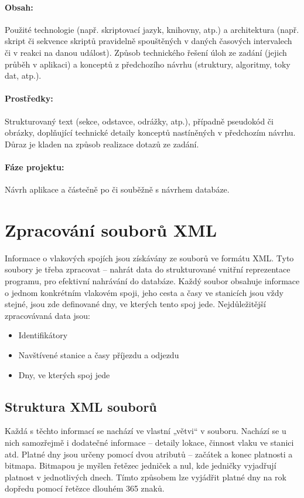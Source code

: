 \documentclass[10pt,xcolor=pdflatex,dvipsnames,table,oneside]{book}
\begin{document}
\paragraph{Obsah:}
Použité technologie (např. skriptovací jazyk, knihovny, atp.)
a architektura (např. skript či sekvence skriptů pravidelně spouštěných v daných časových intervalech či v reakci na danou událost).
Způsob technického řešení úloh ze zadání (jejich průběh v aplikaci) a konceptů z předchozího návrhu (struktury, algoritmy, toky dat, atp.).

\paragraph{Prostředky:}
Strukturovaný text (sekce, odstavce, odrážky, atp.), případně pseudokód či obrázky, doplňující technické detaily konceptů nastíněných v předchozím návrhu.
Důraz je kladen na způsob realizace dotazů ze zadání.

\paragraph{Fáze projektu:}
Návrh aplikace a částečně po či souběžně s návrhem databáze.
\fi
\section{Zpracování souborů XML}

Informace o vlakových spojích jsou získávány ze souborů ve formátu XML. Tyto soubory je třeba zpracovat – nahrát data do strukturované vnitřní reprezentace programu, pro efektivní nahrávání do databáze. Každý soubor obsahuje informace o jednom konkrétním vlakovém spoji, jeho cesta a časy ve stanicích jsou vždy stejné, jsou zde definované dny, ve kterých tento spoj jede. Nejdůležitější zpracovávaná data jsou:

\begin{itemize}
    \item Identifikátory
    \item Navštívené stanice a časy příjezdu a odjezdu
    \item Dny, ve kterých spoj jede
\end{itemize}

\subsection{Struktura XML souborů}
Každá s těchto informací se nachází ve vlastní „větvi“ v souboru. Nachází se u nich samozřejmě i dodatečné informace – detaily lokace, činnost vlaku ve stanici atd. Platné dny jsou určeny pomocí dvou atributů – začátek a konec platnosti a bitmapa. Bitmapou je myšlen řetězec jedniček a nul, kde jedničky vyjadřují platnost v jednotlivých dnech. Tímto způsobem lze vyjádřit platné dny na rok dopředu pomocí řetězce dlouhém 365 znaků.
\end{document}
